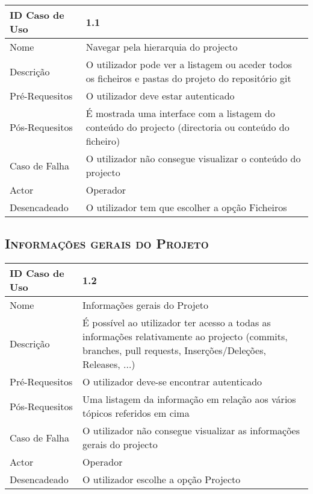 \documentclass[12pt]{article}
\begin{document}
\begin{center}
\begin{tabular}{ | m{4cm} | m{10cm} | } 
\hline
ID Caso de Uso & 1.1 \\
\hline
Nome & Navegar pela hierarquia do projecto\\
\hline
Descrição & O utilizador pode ver a listagem ou aceder todos os ficheiros e pastas do projeto do repositório git\\
\hline
Pré-Requesitos & O utilizador deve estar autenticado\\
\hline
Pós-Requesitos & É mostrada uma interface com a listagem do conteúdo do projecto (directoria ou conteúdo do ficheiro)\\
\hline
Caso de Falha & O utilizador não consegue visualizar o conteúdo do projecto\\
\hline
Actor & Operador\\
\hline
Desencadeado & O utilizador tem que escolher a opção Ficheiros\\
\hline
\end{tabular}
\end{center}


\subsection{ \textsc{Informações gerais do Projeto}}

\begin{center}
\begin{tabular}{ | m{4cm} | m{10cm} | } 
\hline
ID Caso de Uso & 1.2 \\
\hline
Nome & Informações gerais do Projeto\\
\hline
Descrição & É possível ao utilizador ter acesso a todas as informações relativamente ao projecto (commits, branches, pull requests, Inserções/Deleções, Releases, ...)\\
\hline
Pré-Requesitos & O utilizador deve-se encontrar autenticado\\
\hline
Pós-Requesitos & Uma listagem da informação em relação aos vários tópicos referidos em cima\\
\hline
Caso de Falha & O utilizador não consegue visualizar as informações gerais do projecto\\
\hline
Actor & Operador\\
\hline
Desencadeado & O utilizador escolhe a opção Projecto\\
\hline
\end{tabular}
\end{center}
\end{document}
